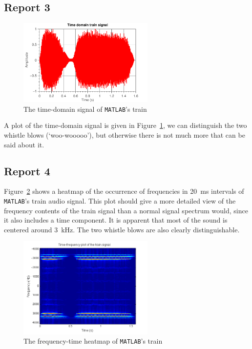 \documentclass[11pt,titlepage]{report}
\begin{document}
\subsection{Report 3}

\begin{figure}[H]
	\centering
	\includegraphics[width=0.6\textwidth]{../../deliverable-7-resources/figures/ass-1/report-3/ass-1-report-3.pdf}
	\caption{The time-domain signal of \texttt{MATLAB}'s train}
	\label{fig:rep3-train-time}
\end{figure}

A plot of the time-domain signal is given in Figure~\ref{fig:rep3-train-time}, we can distinguish the two whistle blows (`woo-wooooo'), but otherwise there is not much more that can be said about it.

\subsection{Report 4}
Figure~\ref{fig:rep4-train-heatmap} shows a heatmap of the occurrence of frequencies in \SI{20}{\milli\second} intervals of \texttt{MATLAB}'s train audio signal. This plot should give a more detailed view of the frequency contents of the train signal than a normal signal spectrum would, since it also includes a time component. It is apparent that most of the sound is centered around \SI{3}{\kilo\hertz}. The two whistle blows are also clearly distinguishable.

\begin{figure}[H]
	\centering
	\includegraphics[width=0.6\textwidth]{../../deliverable-7-resources/figures/ass-1/report-4/ass-1-report-4.png}
	\caption{The frequency-time heatmap of \texttt{MATLAB}'s train}
	\label{fig:rep4-train-heatmap}
\end{figure}
\end{document}
